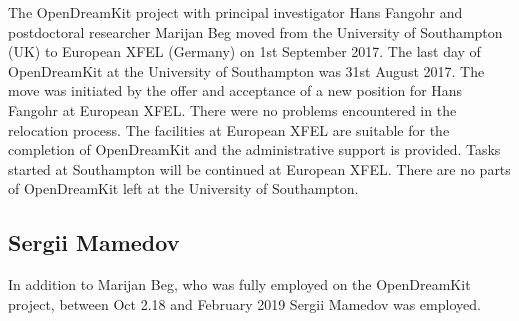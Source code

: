 \documentclass{deliverablereport}
\begin{document}
The OpenDreamKit project with principal investigator Hans Fangohr and
postdoctoral researcher Marijan Beg moved from the University of
Southampton (UK) to European XFEL (Germany) on 1st September 2017. The
last day of OpenDreamKit at the University of Southampton was 31st
August 2017. The move was initiated by the offer and acceptance of a
new position for Hans Fangohr at European XFEL. There were no problems
encountered in the relocation process. The facilities at European XFEL
are suitable for the completion of OpenDreamKit and the administrative
support is provided. Tasks started at Southampton will be continued at
European XFEL. There are no parts of OpenDreamKit left at the
University of Southampton.

\subsection{Sergii Mamedov}

In addition to Marijan Beg, who was fully employed on the OpenDreamKit
project, between Oct 2.18 and February 2019 Sergii Mamedov was
employed.

\end{document}
